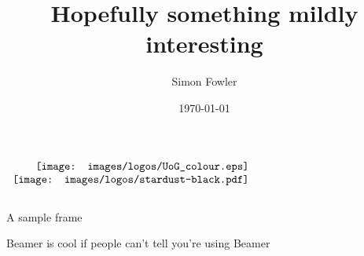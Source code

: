 \documentclass[11.5pt, aspectratio=169]{beamer}
\title{Hopefully something mildly interesting}
\author{Simon Fowler}
\institute{University of Glasgow}
\date{\today}
\begin{document}
\begin{frame}[plain]
\titlepage


\hfill
\vspace{-2em}
$
\begin{array}{r}
    \texttt{[image: images/logos/UoG\_colour.eps]} \\ \vspace{1em}
   \texttt{[image: images/logos/stardust-black.pdf]}
\end{array}
$
\end{frame}


\begin{frame}{A sample frame}
  \begin{fullpageitemize}
    \item Beamer is cool if people can't tell you're using Beamer
  \end{fullpageitemize}
\end{frame}

\end{document}
